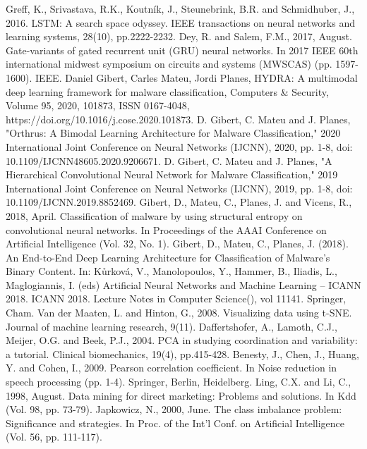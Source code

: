 \documentclass[conference]{IEEEtran}
\begin{document}
{{\begin{thebibliography}{00}
 Greff, K., Srivastava, R.K., Koutník, J., Steunebrink, B.R. and Schmidhuber, J., 2016. LSTM: A search space odyssey. IEEE transactions on neural networks and learning systems, 28(10), pp.2222-2232.
 Dey, R. and Salem, F.M., 2017, August. Gate-variants of gated recurrent unit (GRU) neural networks. In 2017 IEEE 60th international midwest symposium on circuits and systems (MWSCAS) (pp. 1597-1600). IEEE.
 Daniel Gibert, Carles Mateu, Jordi Planes, HYDRA: A multimodal deep learning framework for malware classification, Computers \& Security, Volume 95, 2020, 101873, ISSN 0167-4048, https://doi.org/10.1016/j.cose.2020.101873.
 D. Gibert, C. Mateu and J. Planes, "Orthrus: A Bimodal Learning Architecture for Malware Classification," 2020 International Joint Conference on Neural Networks (IJCNN), 2020, pp. 1-8, doi: 10.1109/IJCNN48605.2020.9206671.
 D. Gibert, C. Mateu and J. Planes, "A Hierarchical Convolutional Neural Network for Malware Classification," 2019 International Joint Conference on Neural Networks (IJCNN), 2019, pp. 1-8, doi: 10.1109/IJCNN.2019.8852469.
 Gibert, D., Mateu, C., Planes, J. and Vicens, R., 2018, April. Classification of malware by using structural entropy on convolutional neural networks. In Proceedings of the AAAI Conference on Artificial Intelligence (Vol. 32, No. 1).
 Gibert, D., Mateu, C., Planes, J. (2018). An End-to-End Deep Learning Architecture for Classification of Malware’s Binary Content. In: Kůrková, V., Manolopoulos, Y., Hammer, B., Iliadis, L., Maglogiannis, I. (eds) Artificial Neural Networks and Machine Learning – ICANN 2018. ICANN 2018. Lecture Notes in Computer Science(), vol 11141. Springer, Cham.
 Van der Maaten, L. and Hinton, G., 2008. Visualizing data using t-SNE. Journal of machine learning research, 9(11).
 Daffertshofer, A., Lamoth, C.J., Meijer, O.G. and Beek, P.J., 2004. PCA in studying coordination and variability: a tutorial. Clinical biomechanics, 19(4), pp.415-428.
 Benesty, J., Chen, J., Huang, Y. and Cohen, I., 2009. Pearson correlation coefficient. In Noise reduction in speech processing (pp. 1-4). Springer, Berlin, Heidelberg.
 Ling, C.X. and Li, C., 1998, August. Data mining for direct marketing: Problems and solutions. In Kdd
(Vol. 98, pp. 73-79).
 Japkowicz, N., 2000, June. The class imbalance problem: Significance and strategies. In Proc. of the
Int’l Conf. on Artificial Intelligence (Vol. 56, pp. 111-117).

\end{thebibliography}}}
\end{document}
